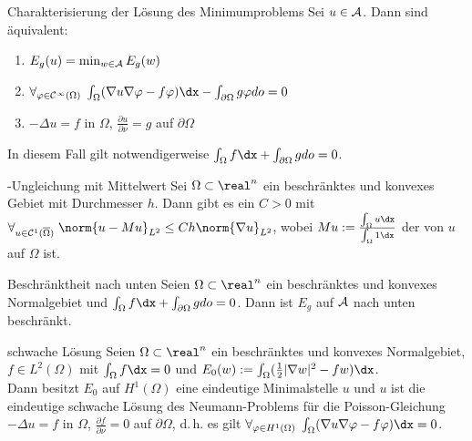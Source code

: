 \linie

\begin{Satz}{Charakterisierung der Lösung des Minimumproblems}
    Sei $u \in \mathcal{A}$.
    Dann sind äquivalent:
    \begin{enumerate}
        \item
        $E_g(u) = \min_{w \in \mathcal{A}} E_g(w)$
        
        \item
        $\forall_{\varphi \in \C^\infty(\Omega)}\;
        \int_\Omega (\nabla u \nabla \varphi - f \varphi)\dx -
        \int_{\partial\Omega} g\varphi do = 0$
        
        \item
        $-\Delta u = f$ in $\Omega$, $\frac{\partial u}{\partial\nu} = g$ auf $\partial\Omega$
    \end{enumerate}
    In diesem Fall gilt notwendigerweise $\int_\Omega f\dx + \int_{\partial\Omega} g do = 0$.
\end{Satz}

\linie

\begin{Satz}{-Ungleichung mit Mittelwert}
    Sei $\Omega \subset \real^n$ ein beschränktes und konvexes Gebiet mit Durchmesser $h$.
    Dann gibt es ein $C > 0$ mit $\forall_{u \in \C^1(\overline{\Omega})}\;
    \norm{u - Mu}_{L^2} \le Ch \norm{\nabla u}_{L^2}$,
    wobei $Mu := \frac{\int_\Omega u\dx}{\int_\Omega 1\dx}$
    der  von $u$ auf $\Omega$ ist.
\end{Satz}

\begin{Satz}{Beschränktheit nach unten}
    Seien $\Omega \subset \real^n$ ein beschränktes und konvexes Normalgebiet
    und $\int_\Omega f\dx + \int_{\partial\Omega} g do = 0$.
    Dann ist $E_g$ auf $\mathcal{A}$ nach unten beschränkt.
\end{Satz}

\linie

\begin{Satz}{schwache Lösung}
    Seien $\Omega \subset \real^n$ ein beschränktes und konvexes Normalgebiet,\\
    $f \in L^2(\Omega)$ mit $\int_\Omega f\dx = 0$ und
    $E_0(w) := \int_\Omega (\frac{1}{2} |\nabla w|^2 - fw)\dx$.\\
    Dann besitzt $E_0$ auf $H^1(\Omega)$ eine eindeutige Minimalstelle $u$ und $u$ ist die
    eindeutige schwache Lösung des Neumann-Problems für die Poisson-Gleichung
    $-\Delta u = f$ in $\Omega$,
    $\frac{\partial f}{\partial\nu} = 0$ auf $\partial\Omega$, d.\,h. es gilt
    $\forall_{\varphi \in H^1(\Omega)}\; \int_\Omega (\nabla u \nabla \varphi - f\varphi)\dx = 0$.
\end{Satz}


